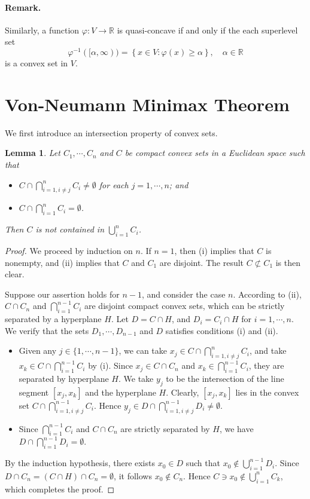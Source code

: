 \documentclass{article}
\numberwithin{equation}{section}
\newcommand{\bbR}{\mathbb{R}}
\newtheorem{lemma}[theorem]{Lemma}
\begin{document}
\paragraph{Remark.} Similarly, a function $\varphi:V\to\bbR$ is quasi-concave if and only if the each superlevel set $$\varphi^{-1}([\alpha,\infty))=\left\{x\in V:\varphi(x)\geq\alpha\right\},\quad\alpha\in\bbR$$ is a convex set in $V$.

\section{Von-Neumann Minimax Theorem}
We first introduce an intersection property of convex sets.
\begin{lemma}\label{kleeconvcover}
Let $C_1,\cdots,C_n$ and $C$ be compact convex sets in a Euclidean space such that
\begin{itemize}
	\item[(i)] $C\cap\bigcap_{i=1,i\neq j}^n C_i\neq\emptyset$ for each $j=1,\cdots,n$; and
	\item[(ii)] $C\cap\bigcap_{i=1}^n C_i=\emptyset$.
\end{itemize}
Then $C$ is not contained in $\bigcup_{i=1}^n C_i$.
\end{lemma}
\begin{proof}
We proceed by induction on $n$. If $n=1$, then (i) implies that $C$ is nonempty, and (ii) implies that $C$ and $C_1$ are disjoint. The result $C\not\subset C_1$ is then clear.

Suppose our assertion holds for $n-1$, and consider the case $n$. According to (ii), $C\cap C_n$ and $\bigcap_{i=1}^{n-1} C_i$ are disjoint compact convex sets, which can be strictly separated by a hyperplane $H$. Let $D=C\cap H$, and $D_i=C_i\cap H$ for $i=1,\cdots,n$. We verify that the sets $D_1,\cdots,D_{n-1}$ and $D$ satisfies conditions (i) and (ii).  

\begin{itemize}
	\item[(i)] Given any $j\in\{1,\cdots,n-1\}$, we can take $x_j\in C\cap\bigcap_{i=1,i\neq j}^n C_i$, and take $x_k\in C\cap\bigcap_{i=1}^{n-1}C_i$ by (i). Since $x_j\in C\cap C_n$ and $x_k\in\bigcap_{i=1}^{n-1}C_i$, they are separated by hyperplane $H$. We take $y_j$ to be the intersection of the line segment $[x_j,x_k]$ and the hyperplane $H$. Clearly, $[x_j,x_k]$ lies in the convex set $C\cap\bigcap_{i=1,i\neq j}^{n-1} C_i$. Hence $y_j\in D\cap\bigcap_{i=1,i\neq j}^{n-1}D_i\neq\emptyset$. 
	\item[(ii)] Since $\bigcap_{i=1}^{n-1} C_i$ and $C\cap C_n$ are strictly separated by $H$, we have $D\cap\bigcap_{i=1}^{n-1}D_i=\emptyset$.
\end{itemize}
By the induction hypothesis, there exists $x_0\in D$ such that $x_0\notin\bigcup_{i=1}^{n-1} D_i$. Since $D\cap C_n=(C\cap H)\cap C_n=\emptyset$, it follows $x_0\notin C_n$. Hence $C\ni x_0\notin \bigcup_{i=1}^{n}C_k$, which completes the proof.
\end{proof}
\end{document}
